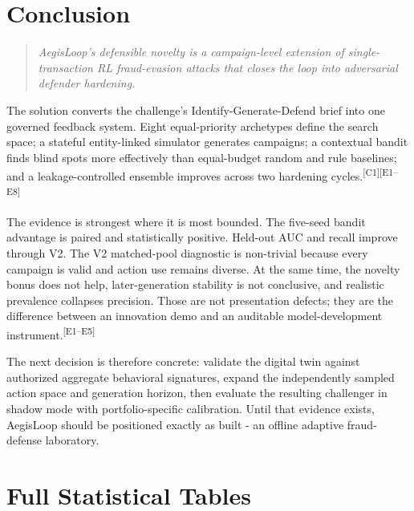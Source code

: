 \documentclass[11pt,a4paper,oneside]{article}
\newcommand{\evidence}[1]{\textsuperscript{\textcolor{EvidenceGray}{[#1]}}}
\newcommand{\competition}{\textsuperscript{\textcolor{EvidenceGray}{[C1]}}}
\newcommand{\sectionlead}[1]{\begin{quote}\itshape #1\end{quote}}
\begin{document}
\section{Conclusion}
\sectionlead{AegisLoop's defensible novelty is a campaign-level extension of single-transaction RL fraud-evasion attacks that closes the loop into adversarial defender hardening.}

The solution converts the challenge's Identify-Generate-Defend brief into one governed feedback system. Eight equal-priority archetypes define the search space; a stateful entity-linked simulator generates campaigns; a contextual bandit finds blind spots more effectively than equal-budget random and rule baselines; and a leakage-controlled ensemble improves across two hardening cycles.\competition\evidence{E1--E8}

The evidence is strongest where it is most bounded. The five-seed bandit advantage is paired and statistically positive. Held-out AUC and recall improve through V2. The V2 matched-pool diagnostic is non-trivial because every campaign is valid and action use remains diverse. At the same time, the novelty bonus does not help, later-generation stability is not conclusive, and realistic prevalence collapses precision. Those are not presentation defects; they are the difference between an innovation demo and an auditable model-development instrument.\evidence{E1--E5}

\begin{evidencebox}
The next decision is therefore concrete: validate the digital twin against authorized aggregate behavioral signatures, expand the independently sampled action space and generation horizon, then evaluate the resulting challenger in shadow mode with portfolio-specific calibration. Until that evidence exists, AegisLoop should be positioned exactly as built - an offline adaptive fraud-defense laboratory.
\end{evidencebox}

\clearpage
\printbibliography[title={References}]

\appendix
\section{Full Statistical Tables}
\end{document}

